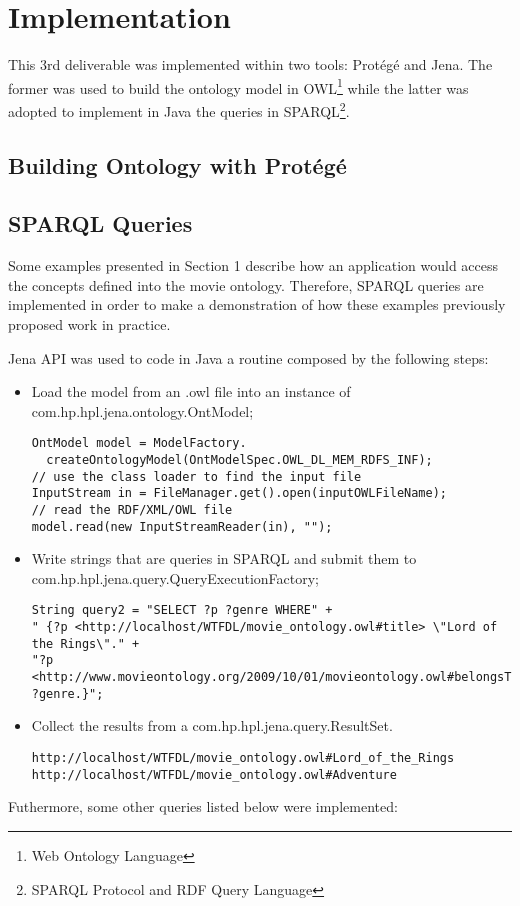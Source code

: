 \documentclass[a4paper,10pt]{article}
\begin{document}
\section{Implementation}

This 3rd deliverable was implemented within two tools: Protégé\cite{protege} and Jena\cite{jena}. The former was used to build the ontology model in OWL\footnote{Web Ontology Language} while the latter was adopted to implement in Java the queries in SPARQL\footnote{SPARQL Protocol and RDF Query Language}.

\subsection{Building Ontology with Protégé}

\subsection{SPARQL Queries}
Some examples presented in Section 1 describe how an application would access the concepts defined into the movie ontology.
Therefore, SPARQL queries are implemented in order to make a demonstration of how these examples previously proposed work in practice.

Jena API was used to code in Java a routine composed by the following steps:

\begin{itemize}
  \item Load the model from an .owl file into an instance of com.hp.hpl.jena.ontology.OntModel;
\begin{lstlisting}
OntModel model = ModelFactory.
  createOntologyModel(OntModelSpec.OWL_DL_MEM_RDFS_INF);
// use the class loader to find the input file
InputStream in = FileManager.get().open(inputOWLFileName);
// read the RDF/XML/OWL file
model.read(new InputStreamReader(in), "");
\end{lstlisting}

  \item Write strings that are queries in SPARQL and submit them to com.hp.hpl.jena.query.QueryExecutionFactory;
\begin{lstlisting}
String query2 = "SELECT ?p ?genre WHERE" +
" {?p <http://localhost/WTFDL/movie_ontology.owl#title> \"Lord of the Rings\"." +
"?p <http://www.movieontology.org/2009/10/01/movieontology.owl#belongsToGenre> ?genre.}";
\end{lstlisting}

  \item Collect the results from a com.hp.hpl.jena.query.ResultSet.
\begin{lstlisting}
http://localhost/WTFDL/movie_ontology.owl#Lord_of_the_Rings
http://localhost/WTFDL/movie_ontology.owl#Adventure
\end{lstlisting}

\end{itemize}

Futhermore, some other queries listed below were implemented:

%
\end{document}
